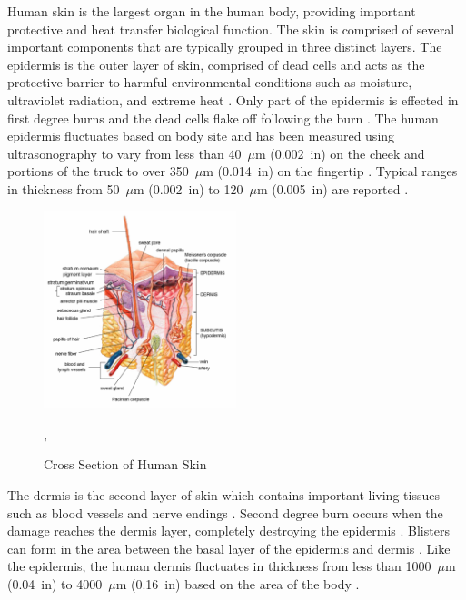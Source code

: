 \documentclass[12pt,oneside]{book}
\begin{document}
Human skin is the largest organ in the human body, providing important protective and heat transfer biological function.  The skin is comprised of several important components that are typically grouped in three distinct layers.  The epidermis is the outer layer of skin, comprised of dead cells and acts as the protective barrier to harmful environmental conditions such as moisture, ultraviolet radiation, and extreme heat \cite{Hummel_Barker_Lyons}. Only part of the epidermis is effected in first degree burns and the dead cells flake off following the burn \cite{Purser_Toxicity_Heat,Hummel_Barker_Lyons}. The human epidermis fluctuates based on body site and has been measured using ultrasonography to vary from less than 40~$\mu$m (0.002~in) on the cheek and portions of the truck to over 350~$\mu$m (0.014~in) on the fingertip \cite{Epidermis_Thickness}. Typical ranges in thickness from 50~$\mu$m (0.002~in) to 120~$\mu$m (0.005~in) are reported \cite{Pigs_Wound_Healing}. 

\begin{figure}[H]
\centering
\includegraphics[width=0.5\textwidth]{../0_Images/Instrumentation/Burn_Measurements/human_skin}
\caption{Cross Section of Human Skin}
\label{fig:inst_human_skin},
\end{figure}

The dermis is the second layer of skin which contains important living tissues such as blood vessels and nerve endings \cite{Hummel_Barker_Lyons}. Second degree burn occurs when the damage reaches the dermis layer, completely destroying the epidermis \cite{Hummel_Barker_Lyons}. Blisters can form in the area between the basal layer of the epidermis and dermis \cite{Purser_Toxicity_Heat}. Like the epidermis, the human dermis fluctuates in thickness from less than 1000~$\mu$m (0.04~in) to 4000~$\mu$m (0.16~in) based on the area of the body \cite{Skin_Pulse,Visualization_Thickness}.
\end{document}
